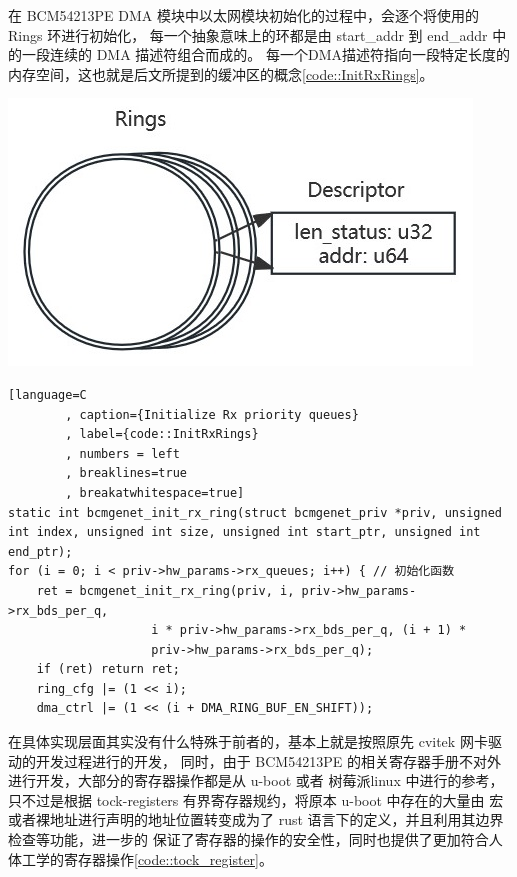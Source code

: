     \begin{adjustwidth}{0cm}{} %
    \begin{minipage}[b]{0.5\linewidth}
        \setlength{\parindent}{2em} %
        在 BCM54213PE DMA 模块中以太网模块初始化的过程中，会逐个将使用的 Rings 环进行初始化，
        每一个抽象意味上的环都是由 start\_addr 到 end\_addr 中的一段连续的 DMA 描述符组合而成的。
        每一个DMA描述符指向一段特定长度的内存空间，这也就是后文所提到的缓冲区的概念\ref{code::InitRxRings}。

    \end{minipage}
    \hfill
    \begin{minipage}[b]{0.45\linewidth}
        \includegraphics[scale=0.6]{./imgs/Rings_and_Descs.jpg}        
         \label{pict:DmaDescAndLoop}
    \end{minipage}
    \end{adjustwidth}

    \begin{lstlisting}[language=C
        , caption={Initialize Rx priority queues}
        , label={code::InitRxRings}
        , numbers = left
        , breaklines=true
        , breakatwhitespace=true]
static int bcmgenet_init_rx_ring(struct bcmgenet_priv *priv, unsigned int index, unsigned int size, unsigned int start_ptr, unsigned int end_ptr);
for (i = 0; i < priv->hw_params->rx_queues; i++) { // 初始化函数
    ret = bcmgenet_init_rx_ring(priv, i, priv->hw_params->rx_bds_per_q,
                    i * priv->hw_params->rx_bds_per_q, (i + 1) *
                    priv->hw_params->rx_bds_per_q);
    if (ret) return ret;
    ring_cfg |= (1 << i);
    dma_ctrl |= (1 << (i + DMA_RING_BUF_EN_SHIFT));
    \end{lstlisting}

    
    在具体实现层面其实没有什么特殊于前者的，基本上就是按照原先 cvitek 网卡驱动的开发过程进行的开发，
    同时，由于 BCM54213PE 的相关寄存器手册不对外进行开发，大部分的寄存器操作都是从 u-boot 或者 树莓派linux
    中进行的参考，只不过是根据 tock-registers 有界寄存器规约，将原本 u-boot 中存在的大量由
    宏或者裸地址进行声明的地址位置转变成为了 rust 语言下的定义，并且利用其边界检查等功能，进一步的
    保证了寄存器的操作的安全性，同时也提供了更加符合人体工学的寄存器操作\ref{code::tock_register}。

